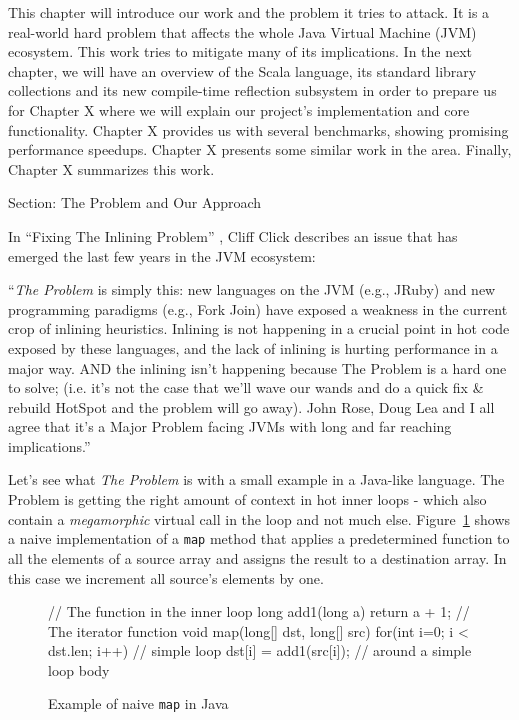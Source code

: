 This chapter will introduce our work and the problem it tries to attack. It is a
real-world hard problem that affects the whole Java Virtual Machine (JVM) 
ecosystem. This work tries to mitigate many of its implications. In the next chapter, we
will have an overview of the Scala language, its standard library collections and its new
compile-time reflection subsystem in order to prepare us for Chapter X
where we will explain our project's implementation and core functionality.
Chapter X provides us with several benchmarks, showing promising performance
speedups. Chapter X presents some similar work in the area. Finally, Chapter X
summarizes this work.

Section: The Problem and Our Approach

In ``Fixing The Inlining Problem'' , Cliff Click describes an issue
that has emerged the last few years in the JVM ecosystem:

``\emph{The Problem} is simply this: new languages on the JVM (e.g., JRuby) and new
programming paradigms (e.g., Fork Join) have exposed a weakness in the current
crop of inlining heuristics.  Inlining is not happening in a crucial point in
hot code exposed by these languages, and the lack of inlining is hurting
performance in a major way.  AND the inlining isn't happening because The
Problem is a hard one to solve; (i.e. it's not the case that we'll wave our
wands and do a quick fix \& rebuild HotSpot and the problem will go away).  
John Rose, Doug Lea and I all agree that it's a Major Problem facing JVMs with long
and far reaching implications.''

Let's see what \emph{The Problem} is with a small example in a Java-like language. The
Problem is getting the right amount of context in hot inner loops - which also
contain a \emph{megamorphic} virtual call in the loop and not much else.  Figure~\ref{java_naive_map} 
shows a naive implementation of a \texttt{map} method that applies a predetermined
function to all the elements of a source array and assigns the result to a
destination array. In this case we increment all source's elements by one.

\begin{figure}
\begin{javaCode}
// The function in the inner loop
long add1(long a) {return a + 1;}
// The iterator function
void map(long[] dst, long[] src) {
  for(int i=0; i < dst.len; i++) // simple loop
    dst[i] = add1(src[i]); // around a simple loop body
}
\end{javaCode}
\caption[Example of naive \texttt{map} in Java]{Example of naive \texttt{map} in Java}
\label{java_naive_map}
\end{figure}

